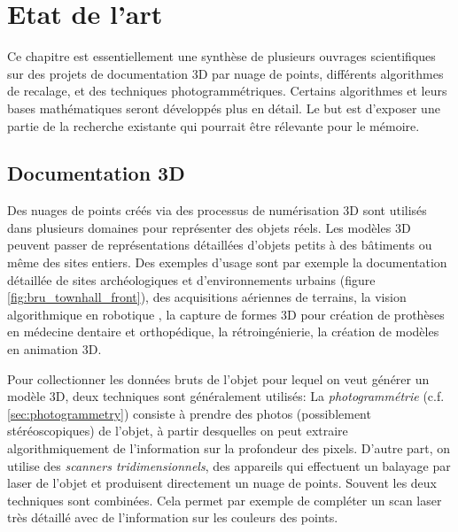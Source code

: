 \documentclass[a4paper,10pt]{scrreprt}
\begin{document}
\chapter{Etat de l'art}
Ce chapitre est essentiellement une synthèse de plusieurs ouvrages scientifiques sur des projets de documentation 3D par nuage de points, différents algorithmes de recalage, et des techniques photogrammétriques. Certains algorithmes et leurs bases mathématiques seront développés plus en détail. Le but est d'exposer une partie de la recherche existante qui pourrait être rélevante pour le mémoire.


\section{Documentation 3D}
Des nuages de points créés via des processus de numérisation 3D sont utilisés dans plusieurs domaines pour représenter des objets réels. Les modèles 3D peuvent passer de représentations détaillées d'objets petits à des bâtiments ou même des sites entiers. Des exemples d'usage sont par exemple la documentation détaillée de sites archéologiques \cite{Web1} \cite{Kein2011} \cite{Grus2012} et d'environnements urbains \cite{Kers2006} (figure \ref{fig:bru_townhall_front}), des acquisitions aériennes de terrains, la vision algorithmique en robotique \cite{Bibe2003}, la capture de formes 3D pour création de prothèses en médecine dentaire et orthopédique, la rétroingénierie, la création de modèles en animation 3D.

Pour collectionner les données bruts de l'objet pour lequel on veut générer un modèle 3D, deux techniques sont généralement utilisés: La \emph{photogrammétrie} (c.f. \ref{sec:photogrammetry}) consiste à prendre des photos (possiblement stéréoscopiques) de l'objet, à partir desquelles on peut extraire algorithmiquement de l'information sur la profondeur des pixels. D'autre part, on utilise des \emph{scanners tridimensionnels}, des appareils qui effectuent un balayage par laser de l'objet et produisent directement un nuage de points. Souvent les deux techniques sont combinées. Cela permet par exemple de compléter un scan laser très détaillé avec de l'information sur les couleurs des points.
\end{document}
